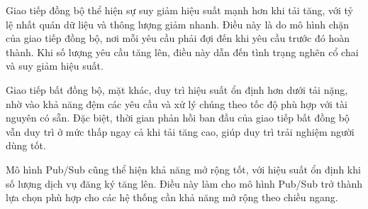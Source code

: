Giao tiếp đồng bộ thể hiện sự suy giảm hiệu suất mạnh hơn khi tải tăng, với tỷ lệ nhất quán dữ liệu và thông lượng giảm nhanh. Điều này là do mô hình chặn của giao tiếp đồng bộ, nơi mỗi yêu cầu phải đợi đến khi yêu cầu trước đó hoàn thành. Khi số lượng yêu cầu tăng lên, điều này dẫn đến tình trạng nghẽn cổ chai và suy giảm hiệu suất.

Giao tiếp bất đồng bộ, mặt khác, duy trì hiệu suất ổn định hơn dưới tải nặng, nhờ vào khả năng đệm các yêu cầu và xử lý chúng theo tốc độ phù hợp với tài nguyên có sẵn. Đặc biệt, thời gian phản hồi ban đầu của giao tiếp bất đồng bộ vẫn duy trì ở mức thấp ngay cả khi tải tăng cao, giúp duy trì trải nghiệm người dùng tốt.

Mô hình Pub/Sub cũng thể hiện khả năng mở rộng tốt, với hiệu suất ổn định khi số lượng dịch vụ đăng ký tăng lên. Điều này làm cho mô hình Pub/Sub trở thành lựa chọn phù hợp cho các hệ thống cần khả năng mở rộng theo chiều ngang.
